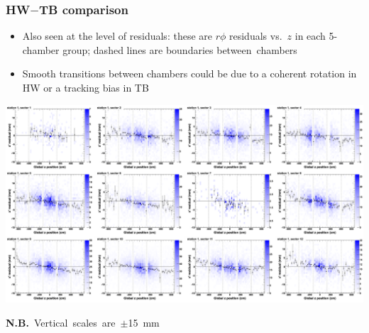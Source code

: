 \documentclass[compress]{beamer}
\begin{document}
\begin{frame}
\begin{columns}
\vfill

\end{columns}
\end{frame}

\begin{frame}
\frametitle{HW$-$TB comparison}
\begin{itemize}
\item Also seen at the level of residuals: these are $r\phi$ residuals
vs.\ $z$ in each 5-chamber group; dashed lines are boundaries \mbox{between chambers\hspace{-1 cm}}
\item Smooth transitions between chambers could be due to a coherent rotation in HW or a tracking bias in TB
\end{itemize}
\begin{center}
\includegraphics[width=0.9\linewidth]{twist2.png}
\end{center}

\vspace{-0.5 cm}
\mbox{\scriptsize {\bf N.B.} Vertical scales are $\pm$15~mm \hspace{-1 cm}}
\end{frame}
\end{document}
